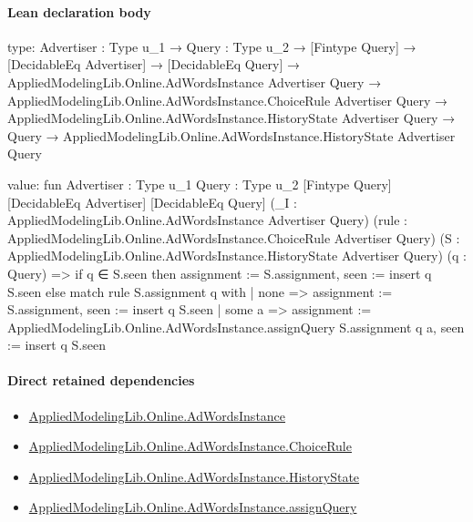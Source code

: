 \documentclass[10pt]{article}
\begin{document}
\paragraph{Lean declaration body}
\begin{ReviewVerbatim}
type:
{Advertiser : Type u_1} →
  {Query : Type u_2} →
    [Fintype Query] →
      [DecidableEq Advertiser] →
        [DecidableEq Query] →
          AppliedModelingLib.Online.AdWordsInstance Advertiser Query →
            AppliedModelingLib.Online.AdWordsInstance.ChoiceRule Advertiser Query →
              AppliedModelingLib.Online.AdWordsInstance.HistoryState Advertiser Query →
                Query → AppliedModelingLib.Online.AdWordsInstance.HistoryState Advertiser Query

value:
fun {Advertiser : Type u_1} {Query : Type u_2} [Fintype Query] [DecidableEq Advertiser] [DecidableEq Query]
    (_I : AppliedModelingLib.Online.AdWordsInstance Advertiser Query)
    (rule : AppliedModelingLib.Online.AdWordsInstance.ChoiceRule Advertiser Query)
    (S : AppliedModelingLib.Online.AdWordsInstance.HistoryState Advertiser Query) (q : Query) =>
  if q ∈ S.seen then { assignment := S.assignment, seen := insert q S.seen }
  else
    match rule S.assignment q with
    | none => { assignment := S.assignment, seen := insert q S.seen }
    | some a =>
      { assignment := AppliedModelingLib.Online.AdWordsInstance.assignQuery S.assignment q a, seen := insert q S.seen }
\end{ReviewVerbatim}

\paragraph{Direct retained dependencies}
\begin{itemize}\raggedright
\item \hyperlink{governing-declaration-e5ce49672bf26ab1}{Applied\allowbreak{}Modeling\allowbreak{}Lib.\allowbreak{}Online.\allowbreak{}Ad\allowbreak{}Words\allowbreak{}Instance}
\item \hyperlink{governing-declaration-7499c79a154f70f9}{Applied\allowbreak{}Modeling\allowbreak{}Lib.\allowbreak{}Online.\allowbreak{}Ad\allowbreak{}Words\allowbreak{}Instance.\allowbreak{}Choice\allowbreak{}Rule}
\item \hyperlink{governing-declaration-0df03b0ef577c095}{Applied\allowbreak{}Modeling\allowbreak{}Lib.\allowbreak{}Online.\allowbreak{}Ad\allowbreak{}Words\allowbreak{}Instance.\allowbreak{}History\allowbreak{}State}
\item \hyperlink{governing-declaration-f24e2e0057d4e2fb}{Applied\allowbreak{}Modeling\allowbreak{}Lib.\allowbreak{}Online.\allowbreak{}Ad\allowbreak{}Words\allowbreak{}Instance.\allowbreak{}assign\allowbreak{}Query}
\end{itemize}
\hypertarget{governing-declaration-8b2e80acf1e26873}{}
\end{document}
